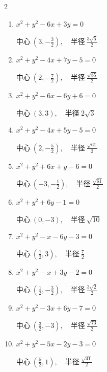 \begin{multicols}{2}
\begin{enumerate}
        $\displaystyle 中心\: \left(-\frac{1}{2},-1\right), \quad 半径 \ \frac{\sqrt{29}}{2}$

  \item $x^{2}+y^{2}-6x+3y=0$

        $\displaystyle 中心\: \left(3,-\frac{3}{2}\right), \quad 半径 \ \frac{3\sqrt{5}}{2}$

  \item $x^{2}+y^{2}-4x+7y-5=0$

        $\displaystyle 中心\: \left(2,-\frac{7}{2}\right), \quad 半径 \ \frac{\sqrt{85}}{2}$

  \item $x^{2}+y^{2}-6x-6y+6=0$

        $\displaystyle 中心\: \left(3,3\right), \quad 半径 \ 2\sqrt{3}$

  \item $x^{2}+y^{2}-4x+5y-5=0$

        $\displaystyle 中心\: \left(2,-\frac{5}{2}\right), \quad 半径 \ \frac{\sqrt{61}}{2}$

  \item $x^{2}+y^{2}+6x+y-6=0$

        $\displaystyle 中心\: \left(-3,-\frac{1}{2}\right), \quad 半径 \ \frac{\sqrt{61}}{2}$

  \item $x^{2}+y^{2}+6y-1=0$

        $\displaystyle 中心\: \left(0,-3\right), \quad 半径 \ \sqrt{10}$

  \item $x^{2}+y^{2}-x-6y-3=0$

        $\displaystyle 中心\: \left(\frac{1}{2},3\right), \quad 半径 \ \frac{7}{2}$

  \item $x^{2}+y^{2}-x+3y-2=0$

        $\displaystyle 中心\: \left(\frac{1}{2},-\frac{3}{2}\right), \quad 半径 \ \frac{3\sqrt{2}}{2}$

  \item $x^{2}+y^{2}-3x+6y-7=0$

        $\displaystyle 中心\: \left(\frac{3}{2},-3\right), \quad 半径 \ \frac{\sqrt{73}}{2}$

\columnbreak %

  \item $x^{2}+y^{2}-5x-2y-3=0$

        $\displaystyle 中心\: \left(\frac{5}{2},1\right), \quad 半径 \ \frac{\sqrt{41}}{2}$


\end{enumerate}
\end{multicols}
